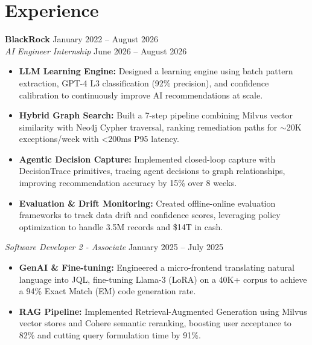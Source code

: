 \documentclass[11pt,a4paper]{article}
\begin{document}
\section{Experience}
\noindent
\textbf{BlackRock} \hfill January 2022 -- August 2026 \\
\textit{AI Engineer Internship} \hfill June 2026 -- August 2026
\begin{itemize}[leftmargin=*,noitemsep,topsep=0pt]
    \item \textbf{LLM Learning Engine:} Designed a learning engine using batch pattern extraction, GPT-4 L3 classification (92\% precision), and confidence calibration to continuously improve AI recommendations at scale.
    \item \textbf{Hybrid Graph Search:} Built a 7-step pipeline combining Milvus vector similarity with Neo4j Cypher traversal, ranking remediation paths for $\sim$20K exceptions/week with <200ms P95 latency.
    \item \textbf{Agentic Decision Capture:} Implemented closed-loop capture with DecisionTrace primitives, tracing agent decisions to graph relationships, improving recommendation accuracy by 15\% over 8 weeks.
    \item \textbf{Evaluation \& Drift Monitoring:} Created offline-online evaluation frameworks to track data drift and confidence scores, leveraging policy optimization to handle 3.5M records and \$14T in cash.
\end{itemize}

\vspace{3pt}
\noindent
\textit{Software Developer 2 - Associate} \hfill January 2025 -- July 2025
\begin{itemize}[leftmargin=*,noitemsep,topsep=0pt]
    \item \textbf{GenAI \& Fine-tuning:} Engineered a micro-frontend translating natural language into JQL, fine-tuning Llama-3 (LoRA) on a 40K+ corpus to achieve a 94\% Exact Match (EM) code generation rate.
    \item \textbf{RAG Pipeline:} Implemented Retrieval-Augmented Generation using Milvus vector stores and Cohere semantic reranking, boosting user acceptance to 82\% and cutting query formulation time by 91\%.
\end{itemize}
\end{document}

